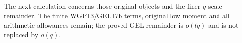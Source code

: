 The next calculation concerns those original
objects and the finer $q$-scale remainder. The finite WGP13/GEL17b
terms, original low moment and all arithmetic allowances remain;
the proved GEL remainder is $o(lq)$ and is not replaced by $o(q)$.